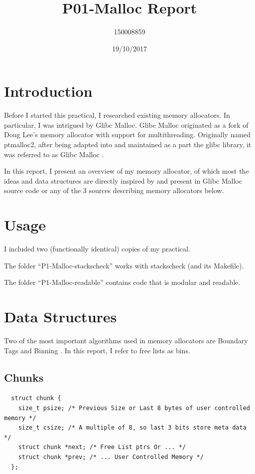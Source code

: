 \documentclass{article}
\title{P01-Malloc Report}
\date{19/10/2017}
\author{150008859}
\begin{document}
\maketitle
\newpage

\section{Introduction}

Before I started this practical, I researched existing memory allocators. In particular, I was intrigued by Glibc Malloc. Glibc Malloc originated as a fork of Doug Lee's memory allocator with support for multithreading. Originally named ptmalloc2, after being adapted into and maintained as a part the glibc library, it was referred to as Glibc Malloc \cite{sploitfun}.

In this report, I present an overview of my memory allocator, of which most the ideas and data structures are directly inspired by and present in Glibc Malloc source code \cite{malloc} or any of the 3 sources describing memory allocators below.

\section{Usage}

I included two (functionally identical) copies of my practical.

The folder ``P1-Malloc-stackscheck'' works with stackscheck (and its Makefile).

The folder ``P1-Malloc-readable'' contains code that is modular and readable.

\section{Data Structures}

Two of the most important algorithms used in memory allocators are Boundary Tags and Binning \cite{douglee}. In this report, I refer to free lists as bins. 

\subsection{Chunks}

\begin{lstlisting}
  struct chunk {
    size_t psize; /* Previous Size or Last 8 bytes of user controlled memory */
    size_t csize; /* A multiple of 8, so last 3 bits store meta data */
    struct chunk *next; /* Free List ptrs Or ... */
    struct chunk *prev; /* ... User Controlled Memory */  
  };
\end{lstlisting}
\end{document}
